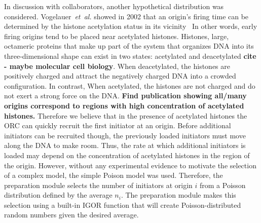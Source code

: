 		In discussion with collaborators, another hypothetical distribution was considered.
		Vogelauer~\emph{et~al.} showed in 2002 that an origin's firing time can be determined by the histone acetylation status in its vicinity~\cite{Histone}
		In other words, early firing origins tend to be placed near acetylated histones.
		Histones, large, octameric proteins that make up part of the system that organizes DNA into its three-dimensional shape can exist in two states: acetylated and deacetylated \textbf{cite - maybe molecular cell biology}.
		When deacetylated, the histones are positively charged and attract the negatively charged DNA into a crowded configuration.
		In contrast, When acetylated, the histones are not charged and do not exert a strong force on the DNA.
		\textbf{Find publication showing all/many origins correspond to regions with high concentration of acetylated histones.}
		Therefore we believe that in the presence of acetylated histones the ORC can quickly recruit the first initiator at an origin.
		Before additional initiators can be recruited though, the previously loaded initiators must move along the DNA to make room.
		Thus, the rate at which additional initiators is loaded may depend on the concentration of acetylated histones in the region of the origin.
		However, without any experimental evidence to motivate the selection of a complex model, the simple Poison model was used.
		Therefore, the preparation module selects the number of initiators at origin $i$ from a Poisson distribution defined by the average $n_i$.
		The preparation module makes this selection using a built-in IGOR function that will create Poisson-distributed random numbers given the desired average.
		

